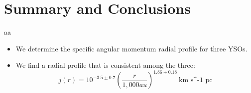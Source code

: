 \section{Summary and Conclusions}
aa
\begin{itemize}
\item We determine the specific angular momentum radial profile for three YSOs. 
\item We find a radial profile that is consistent among the three:
\[ j(r) = 10^{-3.5\pm0.7}\left( \frac{r}{1,000 au}\right)^{1.86\pm 0.18}~\textrm{km s^{-1} pc}\]
\end{itemize}
  
